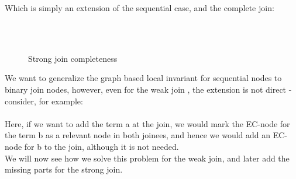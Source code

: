 Which is simply an extension of the sequential case, and the complete join:
\begin{figure}[H]
\\
\\
\caption{Strong join completeness}
\end{figure}



%
%
We want to generalize the graph based local invariant for sequential nodes to binary join nodes, however, even for the weak join , the extension is not direct - consider, for example:\\
\\
Here, if we want to add the term a at the join, we would mark the EC-node for the term b as a relevant node in both joinees,
and hence we would add an EC-node for b to the join, although it is not needed.\\
We will now see how we solve this problem for the weak join, and later add the missing parts for the strong join.

